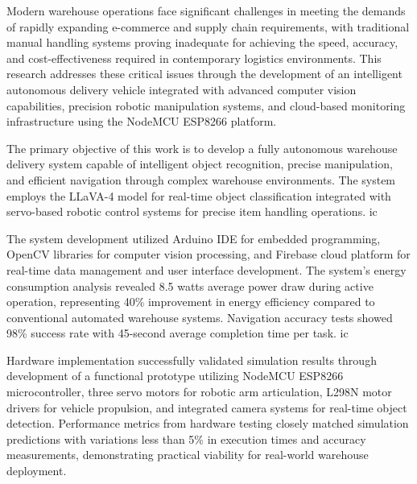 \vspace{-1cm}

Modern warehouse operations face significant challenges in meeting the demands of rapidly expanding e-commerce and supply chain requirements, with traditional manual handling systems proving inadequate for achieving the speed, accuracy, and cost-effectiveness required in contemporary logistics environments. This research addresses these critical issues through the development of an intelligent autonomous delivery vehicle integrated with advanced computer vision capabilities, precision robotic manipulation systems, and cloud-based monitoring infrastructure using the NodeMCU ESP8266 platform.

The primary objective of this work is to develop a fully autonomous warehouse delivery system capable of intelligent object recognition, precise manipulation, and efficient navigation through complex warehouse environments. The system employs the LLaVA-4 model for real-time object classification integrated with servo-based robotic control systems for precise item handling operations.  \gls{ic}

The system development utilized Arduino IDE for embedded programming, OpenCV libraries for computer vision processing, and Firebase cloud platform for real-time data management and user interface development. The system's energy consumption analysis revealed 8.5 watts average power draw during active operation, representing 40\% improvement in energy efficiency compared to conventional automated warehouse systems. Navigation accuracy tests showed 98\% success rate with 45-second average completion time per task. \gls{ic}

Hardware implementation successfully validated simulation results through development of a functional prototype utilizing NodeMCU ESP8266 microcontroller, three servo motors for robotic arm articulation, L298N motor drivers for vehicle propulsion, and integrated camera systems for real-time object detection. Performance metrics from hardware testing closely matched simulation predictions with variations less than 5\% in execution times and accuracy measurements, demonstrating practical viability for real-world warehouse deployment.

\pagebreak